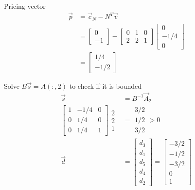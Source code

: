 \documentclass[a4paper,10pt]{article}
\begin{document}
\begin{enumerate}
\begin{enumerate}
{\begin{enumerate}
                    Pricing vector 
                    \begin{align}
                        \vec{p} &= \vec{c}_N - N^T\vec{v} \\
                        &= \begin{bmatrix} 0 \\ -1 \end{bmatrix} - \begin{bmatrix} 0 & 1 & 0 \\ 2 & 2 & 1 \end{bmatrix} \begin{bmatrix} 0 \\ -1/4 \\ 0 \end{bmatrix} \\
                        &= \begin{bmatrix} 1/4 \\ -1/2 \end{bmatrix}
                    \end{align}

                    Solve $B\vec{s}=A(:,2)$ to check if it is bounded
                    \begin{align}
                        \vec{s} &= B^{-1}\vec{A}_2 \\
                        \begin{bmatrix} 1 & -1/4 & 0 \\ 0 & 1/4 & 0 \\ 0 & 1/4 & 1 \end{bmatrix} \begin{matrix} 2 \\ 2 \\ 1 \end{matrix} &= \begin{matrix} 3/2 \\ 1/2 \\ 3/2 \end{matrix} > 0 \\
                        \vec{d} &= \begin{bmatrix} d_3 \\ d_1 \\ d_5 \\ d_4 \\ d_2 \end{bmatrix} = \begin{bmatrix} -3/2 \\ -1/2 \\ -3/2 \\ 0 \\ 1 \end{bmatrix}
                    \end{align}


\end{enumerate}}
\end{enumerate}
\end{enumerate}
\end{document}
